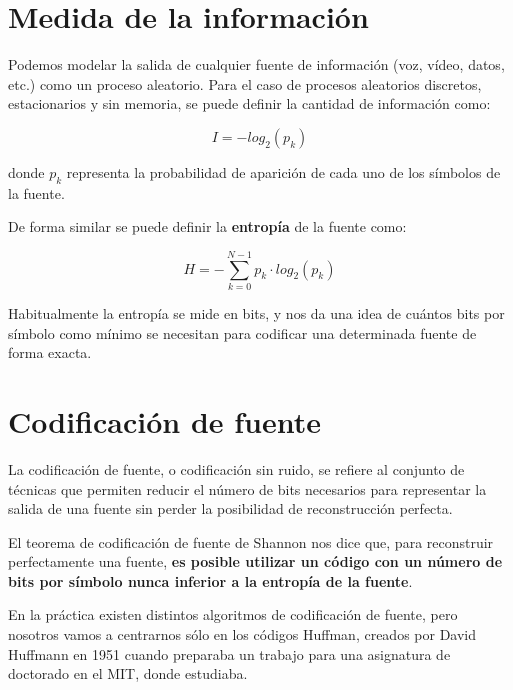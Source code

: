 \documentclass[es,apuntes]{uah}
\begin{document}

\maketitle


\section{Medida de la información}

Podemos modelar la salida de cualquier fuente de información (voz, vídeo, datos, etc.) como un proceso aleatorio. Para el caso de procesos aleatorios discretos, estacionarios y sin memoria, se puede definir la cantidad de información como:

\begin{displaymath}
	I = -log_2(p_k)
\end{displaymath}

donde $p_k$ representa la probabilidad de aparición de cada uno de los símbolos de la fuente. 

De forma similar se puede definir la {\bf entropía} de la fuente como:

\begin{equation}
	H = - \sum_{k=0}^{N-1}p_k \cdot  log_2(p_k)
\end{equation}

Habitualmente la entropía se mide en bits, y nos da una idea de cuántos bits por símbolo como mínimo se necesitan para codificar una determinada fuente de forma exacta.

\section{Codificación de fuente}

La codificación de fuente, o codificación sin ruido, se refiere al conjunto de técnicas que permiten reducir el número de bits necesarios para representar la salida de una fuente sin perder la posibilidad de reconstrucción perfecta. 

El teorema de codificación de fuente de Shannon nos dice que, para reconstruir perfectamente una fuente, {\bf es posible utilizar un código con un número de bits por símbolo nunca inferior a la entropía de la fuente}.

En la práctica existen distintos algoritmos de codificación de fuente, pero nosotros vamos a centrarnos sólo en los códigos Huffman, creados por David Huffmann en 1951 cuando preparaba un trabajo para una asignatura de doctorado en el MIT, donde estudiaba.
\end{document}
